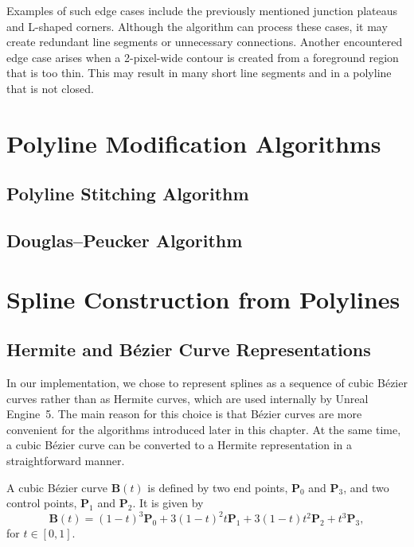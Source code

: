 Examples of such edge cases include the previously mentioned junction plateaus and L-shaped corners. Although the algorithm can process these cases, it may create redundant line segments or unnecessary connections. Another encountered edge case arises when a 2-pixel-wide contour is created from a foreground region that is too thin. This may result in many short line segments and in a polyline that is not closed.



\section{Polyline Modification Algorithms}



\subsection{Polyline Stitching Algorithm}



\subsection{Douglas--Peucker Algorithm} %



\section{Spline Construction from Polylines}

\subsection{Hermite and B\'ezier Curve Representations}

In our implementation, we chose to represent splines as a sequence of cubic B\'ezier curves rather than as Hermite curves, which are used internally by Unreal Engine~5. The main reason for this choice is that B\'ezier curves are more convenient for the algorithms introduced later in this chapter. At the same time, a cubic B\'ezier curve can be converted to a Hermite representation in a straightforward manner.

A cubic B\'ezier curve $\mathbf{B}(t)$ is defined by two end points, $\mathbf{P}_0$ and $\mathbf{P}_3$, and two control points, $\mathbf{P}_1$ and $\mathbf{P}_2$. It is given by
\begin{equation}
	\mathbf{B}(t) = (1 - t)^3\mathbf{P}_0 + 3(1-t)^2t\mathbf{P}_1 + 3(1-t)t^2\mathbf{P}_2 + t^3\mathbf{P}_3,
\end{equation}
for $t \in [0,1]$.

